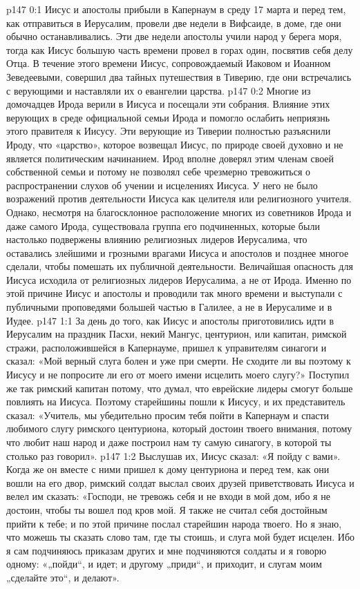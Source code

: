 \vs p147 0:1 Иисус и апостолы прибыли в Капернаум в среду 17 марта и перед тем, как отправиться в Иерусалим, провели две недели в Вифсаиде, в доме, где они обычно останавливались. Эти две недели апостолы учили народ у берега моря, тогда как Иисус большую часть времени провел в горах один, посвятив себя делу Отца. В течение этого времени Иисус, сопровождаемый Иаковом и Иоанном Зеведеевыми, совершил два тайных путешествия в Тиверию, где они встречались с верующими и наставляли их о евангелии царства.
\vs p147 0:2 Многие из домочадцев Ирода верили в Иисуса и посещали эти собрания. Влияние этих верующих в среде официальной семьи Ирода и помогло ослабить неприязнь этого правителя к Иисусу. Эти верующие из Тиверии полностью разъяснили Ироду, что «царство», которое возвещал Иисус, по природе своей духовно и не является политическим начинанием. Ирод вполне доверял этим членам своей собственной семьи и потому не позволял себе чрезмерно тревожиться о распространении слухов об учении и исцелениях Иисуса. У него не было возражений против деятельности Иисуса как целителя или религиозного учителя. Однако, несмотря на благосклонное расположение многих из советников Ирода и даже самого Ирода, существовала группа его подчиненных, которые были настолько подвержены влиянию религиозных лидеров Иерусалима, что оставались злейшими и грозными врагами Иисуса и апостолов и позднее многое сделали, чтобы помешать их публичной деятельности. Величайшая опасность для Иисуса исходила от религиозных лидеров Иерусалима, а не от Ирода. Именно по этой причине Иисус и апостолы и проводили так много времени и выступали с публичными проповедями большей частью в Галилее, а не в Иерусалиме и в Иудее.
\vs p147 1:1 За день до того, как Иисус и апостолы приготовились идти в Иерусалим на праздник Пасхи, некий Мангус, центурион, или капитан, римской стражи, расположившейся в Капернауме, пришел к управителям синагоги и сказал: «Мой верный слуга болен и уже при смерти. Не сходите ли вы поэтому к Иисусу и не попросите ли его от моего имени исцелить моего слугу?» Поступил же так римский капитан потому, что думал, что еврейские лидеры смогут больше повлиять на Иисуса. Поэтому старейшины пошли к Иисусу, и их представитель сказал: «Учитель, мы убедительно просим тебя пойти в Капернаум и спасти любимого слугу римского центуриона, который достоин твоего внимания, потому что любит наш народ и даже построил нам ту самую синагогу, в которой ты столько раз говорил».
\vs p147 1:2 Выслушав их, Иисус сказал: «Я пойду с вами». Когда же он вместе с ними пришел к дому центуриона и перед тем, как они вошли на его двор, римский солдат выслал своих друзей приветствовать Иисуса и велел им сказать: «Господи, не тревожь себя и не входи в мой дом, ибо я не достоин, чтобы ты вошел под кров мой. Я также не считал себя достойным прийти к тебе; и по этой причине послал старейшин народа твоего. Но я знаю, что можешь ты сказать слово там, где ты стоишь, и слуга мой будет исцелен. Ибо я сам подчиняюсь приказам других и мне подчиняются солдаты и я говорю одному: «„пойди“, и идет; и другому „приди“, и приходит, и слугам моим „сделайте это“, и делают».
